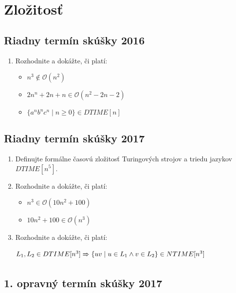 \documentclass[11pt,a4paper]{article}
\begin{document}
	\section{Zložitosť}

		\subsection{Riadny termín skúšky 2016}

		\begin{enumerate}
			\item Rozhodnite a dokážte, či platí:
			
			\begin{itemize}
				\item $n^3 \notin \mathcal{O}(n^2)$		
				\item $2n^n + 2n + n \in \mathcal{O}(n^2 - 2n - 2)$	
				\item $\{a^nb^nc^n \mid n \geq 0\} \in DTIME[n]$
			\end{itemize}
		\end{enumerate}	

		\subsection{Riadny termín skúšky 2017}

		\begin{enumerate}
			\item Definujte formálne časovú zložitosť Turingových strojov a triedu jazykov $DTIME[n^5]$.

			\item Rozhodnite a dokážte, či platí:
	
			\begin{itemize}
				\item $n^3 \in \mathcal{O}(10n^2 + 100)$
				\item $10n^2 + 100 \in \mathcal{O}(n^3)$
			\end{itemize}
	
			\item Rozhodnite a dokážte, či platí:
	
			$L_1, L_2 \in DTIME[n^3] \xRightarrow[]{} \{ uv \mid u \in  L_1 \land v \in L_2\} \in NTIME[n^3]$
		\end{enumerate}	

		\subsection{1. opravný termín skúšky 2017}
\end{document}
